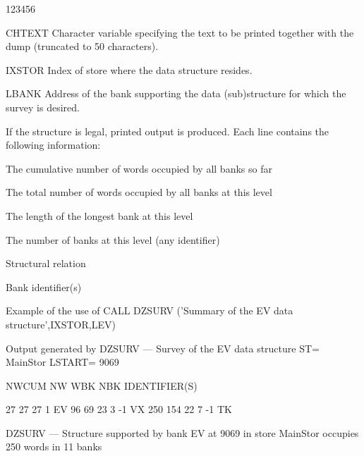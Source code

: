 \begin{DLtt}{123456}
\item[CHTEXT]Character variable specifying the text to be printed
together with the dump (truncated to 50 characters).
\item[IXSTOR]Index of store where the data structure resides.
\item[LBANK]Address of the bank supporting the data (sub)structure for which
the survey is desired.
\end{DLtt}
If the structure is legal, printed output is produced.
Each line contains the following information:
\begin{UL}
\item The cumulative number of words occupied by all banks so far
\item The total number of words occupied by all banks at this level
\item The length of the longest bank at this level
\item The number of banks at this level (any identifier)
\item Structural relation
\item Bank identifier(s)
\end{UL}

\newpage
\begin{XMPt}{Example of the use of }
      CALL DZSURV ('Summary of the EV data structure',IXSTOR,LEV)
\end{XMPt}
\begin{XMPt}{Output generated by }
DZSURV --- Survey of the EV data structure  ST= MainStor  LSTART=     9069
                                                                                                                                 
  NWCUM     NW   WBK  NBK    IDENTIFIER(S)                                                                                       
                                                                                                                                 
     27     27    27    1     EV                                                                                                 
     96     69    23    3       -1 VX                                                                                            
    250    154    22    7            -1 TK                                                                                       

DZSURV --- Structure supported by bank EV at 9069 in store MainStor occupies 250 words in 11 banks        
\end{XMPt}

